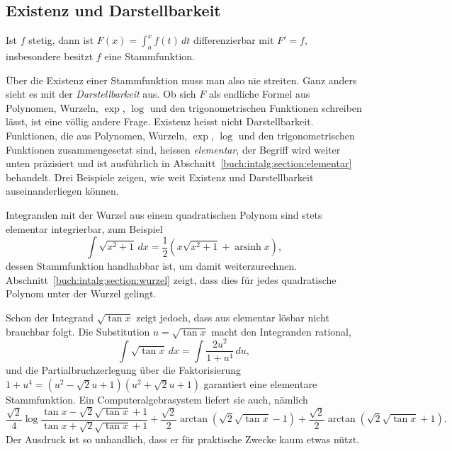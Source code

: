 \subsection{Existenz und Darstellbarkeit}
\begin{satz}
Ist $f$ stetig, dann ist $F(x) = \int_a^x f(t)\,dt$
differenzierbar mit $F' = f$, insbesondere besitzt $f$ eine
Stammfunktion.
\end{satz}
Über die Existenz einer Stammfunktion muss man also nie streiten.
Ganz anders sieht es mit der \emph{Darstellbarkeit} aus.
Ob sich $F$ als endliche Formel aus Polynomen, Wurzeln, $\exp$,
$\log$ und den trigonometrischen Funktionen schreiben lässt,
ist eine völlig andere Frage.
Existenz heisst nicht Darstellbarkeit.
Funktionen, die aus Polynomen, Wurzeln, $\exp$, $\log$ und den
trigonometrischen Funktionen zusammengesetzt sind, heissen
\emph{elementar}, der Begriff wird weiter unten präzisiert und ist
ausführlich in Abschnitt~\ref{buch:intalg:section:elementar}
behandelt.
Drei Beispiele zeigen, wie weit Existenz und Darstellbarkeit
auseinanderliegen können.

Integranden mit der Wurzel aus einem quadratischen Polynom sind
stets elementar integrierbar, zum Beispiel
\begin{equation}
\int \sqrt{x^2+1}\,dx
=
\frac{1}{2}\left(x\sqrt{x^2+1} + \operatorname{arsinh} x\right),
\label{elliptisch:equation:wurzelstandard}
\end{equation}
dessen Stammfunktion handhabbar ist, um damit weiterzurechnen.
Abschnitt~\ref{buch:intalg:section:wurzel} zeigt, dass dies für
jedes quadratische Polynom unter der Wurzel gelingt.

Schon der Integrand $\sqrt{\tan x}$ zeigt jedoch, dass aus
elementar lösbar nicht brauchbar folgt.
Die Substitution $u = \sqrt{\tan x}$ macht den Integranden
rational,
\begin{equation}
\int \sqrt{\tan x}\,dx
=
\int \frac{2u^2}{1+u^4}\,du,
\label{elliptisch:equation:tanxrational}
\end{equation}
und die Partialbruchzerlegung über die Faktorisierung
$1+u^4 = (u^2-\sqrt{2}u+1)(u^2+\sqrt{2}u+1)$
garantiert eine elementare Stammfunktion.
Ein Computeralgebrasystem liefert sie auch, nämlich
\begin{equation}
\frac{\sqrt{2}}{4}
\log\frac{\tan x-\sqrt{2}\sqrt{\tan x}+1}
        {\tan x+\sqrt{2}\sqrt{\tan x}+1}
+
\frac{\sqrt{2}}{2}\arctan\left(\sqrt{2}\sqrt{\tan x}-1\right)
+
\frac{\sqrt{2}}{2}\arctan\left(\sqrt{2}\sqrt{\tan x}+1\right).
\label{elliptisch:equation:tanxmonster}
\end{equation}
Der Ausdruck ist so unhandlich, dass er für praktische Zwecke
kaum etwas nützt.

